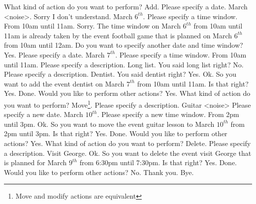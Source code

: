 \begin{itemize}
						\begin{dialogue}
								 What kind of action do you want to perform?
								 Add.
								 Please specify a date.
								 March <noise>.
								 Sorry I don't understand.
								 March $6^{th}$.
								 Please specify a time window.
								 From 10am until 11am.
								 Sorry. The time window on March $6^{th}$ from 10am until 11am is already taken by the event football game that is planned on March $6^{th}$ from 10am until 12am. Do you want to specify another date and time window?
								 Yes.
								 Please specify a date.
								 March $7^{th}$.
								 Please specify a time window.
								 From 10am until 11am.
								 Please specify a description.
								 Long list.
								 You said long list right?
								 No.
								 Please specify a description.
								 Dentist.
								 You said dentist right?
								 Yes.
								 Ok. So you want to add the event dentist on March $7^{th}$ from 10am until 11am. Is that right?
								 Yes.
								 Done. Would you like to perform other actions?
								 Yes.
								 What kind of action do you want to perform?
								 Move\footnote{Move and modify actions are equivalent}.
								 Please specify a description.
								 Guitar <noise>
								 Please specify a new date.
								 March $10^{th}$.
								 Please specify a new time window.
								 From 2pm until 3pm.
								 Ok. So you want to move the event guitar lesson to March $10^{th}$ from 2pm until 3pm. Is that right?
								 Yes.
								 Done. Would you like to perform other actions?
								 Yes.
								 What kind of action do you want to perform?
								 Delete.
								 Please specify a description.
								 Visit George.
								 Ok. So you want to delete the event visit George that is planned for March $9^{th}$ from 6:30pm until 7:30pm. Is that right?
								 Yes.
								 Done. Would you like to perform other actions?
								 No.
								 Thank you. Bye.
						\end{dialogue}


\end{itemize}
